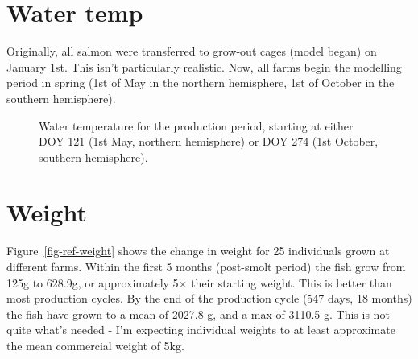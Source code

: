\documentclass[
  a4paper,
]{article}
\begin{document}
\section{Water temp}\label{water-temp}

Originally, all salmon were transferred to grow-out cages (model began)
on January 1st. This isn't particularly realistic. Now, all farms begin
the modelling period in spring (1st of May in the northern hemisphere,
1st of October in the southern hemisphere).

\begin{figure}


\caption{\label{fig-water-temp}Water temperature for the production
period, starting at either DOY 121 (1st May, northern hemisphere) or DOY
274 (1st October, southern hemisphere).}

\end{figure}%

\section{Weight}\label{weight}

Figure~\ref{fig-ref-weight} shows the change in weight for 25
individuals grown at different farms. Within the first 5 months
(post-smolt period) the fish grow from 125g to 628.9g, or approximately
5\(\times\) their starting weight. This is better than most production
cycles. By the end of the production cycle (547 days, 18 months) the
fish have grown to a mean of 2027.8 g, and a max of 3110.5 g. This is
not quite what's needed - I'm expecting individual weights to at least
approximate the mean commercial weight of 5kg.
\end{document}
